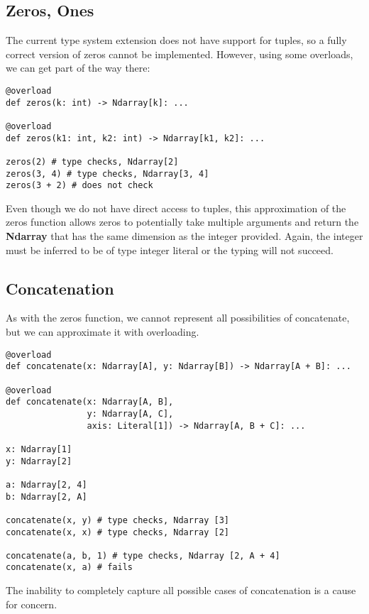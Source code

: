 \documentclass[12pt]{report}
\begin{document}
\subsection{Zeros, Ones}
The current type system extension does not have support for tuples, so a fully correct version of zeros cannot be implemented. However, using some overloads, we can get part of the way there:

\begin{singlespace*}
    \begin{verbatim}
@overload
def zeros(k: int) -> Ndarray[k]: ...

@overload
def zeros(k1: int, k2: int) -> Ndarray[k1, k2]: ...

zeros(2) # type checks, Ndarray[2]
zeros(3, 4) # type checks, Ndarray[3, 4]
zeros(3 + 2) # does not check\end{verbatim}
\end{singlespace*}
Even though we do not have direct access to tuples, this approximation of the zeros function allows zeros to potentially take multiple arguments and return the \textbf{Ndarray} that has the same dimension as the integer provided. Again, the integer must be inferred to be of type integer literal or the typing will not succeed.

\subsection{Concatenation}
As with the zeros function, we cannot represent all possibilities of concatenate, but we can approximate it with overloading.

\begin{singlespace*}
    \begin{verbatim}
@overload
def concatenate(x: Ndarray[A], y: Ndarray[B]) -> Ndarray[A + B]: ...

@overload
def concatenate(x: Ndarray[A, B],
                y: Ndarray[A, C],
                axis: Literal[1]) -> Ndarray[A, B + C]: ...

x: Ndarray[1]
y: Ndarray[2]

a: Ndarray[2, 4]
b: Ndarray[2, A]

concatenate(x, y) # type checks, Ndarray [3]
concatenate(x, x) # type checks, Ndarray [2]

concatenate(a, b, 1) # type checks, Ndarray [2, A + 4]
concatenate(x, a) # fails\end{verbatim}
\end{singlespace*}
The inability to completely capture all possible cases of concatenation is a cause for concern.
\end{document}
